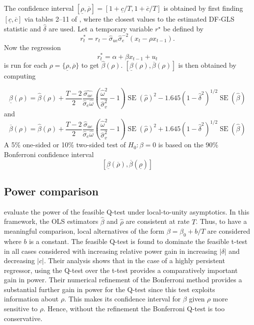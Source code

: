 \documentclass{article}
\begin{document}
The confidence interval $[\underline{\rho}, \overline{\rho}]=[1+\underline{c} / T, 1+\overline{c} / T]$ is obtained by first finding $[\underline{c}, \overline{c}]$ via tables 2–11 of \citet{campbell2005implementing}, where the closest values to the estimated DF-GLS statistic and $\hat{\delta}$ are used. Let a temporary variable $r^{\star}$ be defined by
\begin{equation}
r_{t}^{*}=r_{t}-\widehat{\sigma}_{u e} \widehat{\sigma}_{e}^{-2}\left(x_{t}-\rho x_{t-1}\right).
\end{equation}
Now the regression
\begin{equation}
r_{t}^{*}=\alpha+\beta x_{t-1}+u_{t}
\end{equation} 
is run for each $\rho=\{\underline{\rho}, \overline{\rho}\}$ to get $\widehat{\beta}(\rho)$. $[\underline{\beta}(\rho), \overline{\beta}(\rho)]$ is then obtained by computing

\begin{equation}
\underline{\beta}(\rho)=\widehat{\beta}(\rho)+\frac{T-2}{2} \frac{\widehat{\sigma_{ue}}}{\widehat{\sigma}_{e} \widehat{\omega}}\left(\frac{\widehat{\omega}^{2}}{\widehat{\sigma}_{v}^{2}}-1\right) \operatorname{SE}(\widehat{\rho})^{2}-1.645\left(1-\widehat{\delta}^{2}\right)^{1 / 2} \operatorname{SE}(\widehat{\beta})
\end{equation}
and 
\begin{equation}
\overline{\beta}(\rho)=\widehat{\beta}(\rho)+\frac{T-2}{2} \frac{\widehat{\sigma}_{u e}}{\widehat{\sigma}_{e} \widehat{\omega}}\left(\frac{\widehat{\omega}^{2}}{\widehat{\sigma}_{v}^{2}}-1\right) \operatorname{SE}(\widehat{\rho})^{2}+1.645\left(1-\widehat{\delta}^{2}\right)^{1 / 2} \operatorname{SE}(\widehat{\beta})
\end{equation}
A 5\% one-sided or 10\% two-sided test of $H_0: \beta = 0$ is based on the 90\% Bonferroni confidence interval
$$[\underline{\beta}(\overline{\rho}), \overline{\beta}(\underline{\rho})]$$
\subsection{Power comparison}
\label{power}
\citet{campbell2006efficient} evaluate the power of the feasible Q-test under local-to-unity asymptotics. In this framework, the OLS estimators $\hat{\beta}$ and $\hat{\rho}$ are consistent at rate $T$. Thus, to have a meaningful comparison, local alternatives of the form $\beta = \beta_0 + b/T$ are considered where $b$ is a constant. The feasible Q-test is found to dominate the feasible t-test in all cases considered with increasing relative power gain in increasing $|\delta|$ and decreasing $|c|$. Their analysis shows that in the case of a highly persistent regressor, using the Q-test over the t-test provides a comparatively important gain in power. Their numerical refinement of the Bonferroni method provides a substantial further gain in power for the Q-test since this test exploits information about $\rho$. This makes its confidence interval for $\beta$ given $\rho$ more sensitive to $\rho$. Hence, without the refinement the Bonferroni Q-test is too conservative.
\end{document}
